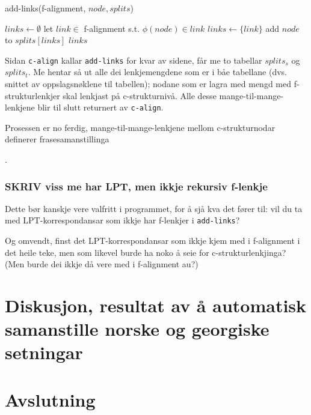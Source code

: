 \documentclass[11pt,a4paper,oneside,draft]{book}
\begin{document}
   \begin{algorithm}[]
   \caption{add-links(f-alignment, $node, splits$)}
   \label{algo:add-links}
      
        $links \gets \emptyset$\;
    {
        {
          let $link \in$ f-alignment s.t. $\phi(node) \in link$ \;
           {$links \gets \{link\}$}
        }
        add $node$ to $splits[links]$ \;
       }
        \Return $links$ \;
  \end{algorithm}

Sidan \texttt{c-align} kallar \texttt{add-links} for kvar av sidene, får me to
tabellar $splits_s$ og $splits_t$. Me hentar så ut alle dei
lenkjemengdene som er i båe tabellane (dvs. snittet av oppslagsnøklene
til tabellen); nodane som er lagra med mengd med f-strukturlenkjer
skal lenkjast på c-strukturnivå. Alle desse mange-til-mange-lenkjene
blir til slutt returnert av \texttt{c-align}.

Prosessen er no ferdig, mange-til-mange-lenkjene mellom
c-strukturnodar definerer frasesamanstillinga

.


\subsection{\textbf{SKRIV} viss me har LPT, men ikkje rekursiv f-lenkje}
\label{sec-4.3.1}

    Dette bør kanskje vere valfritt i programmet, for å sjå kva det
    fører til: vil du ta med LPT-korrespondansar som ikkje har
    f-lenkjer i \texttt{add-links}?

    Og omvendt, finst det LPT-korrespondansar som ikkje kjem med i
    f-alignment i det heile teke, men som likevel burde ha noko å seie
    for c-strukturlenkjinga? (Men burde dei ikkje då vere med i
    f-alignment au?)



\chapter{Diskusjon, resultat av å automatisk samanstille norske og georgiske setningar}
\chapter{Avslutning}
\label{sec-6}




\end{document}
